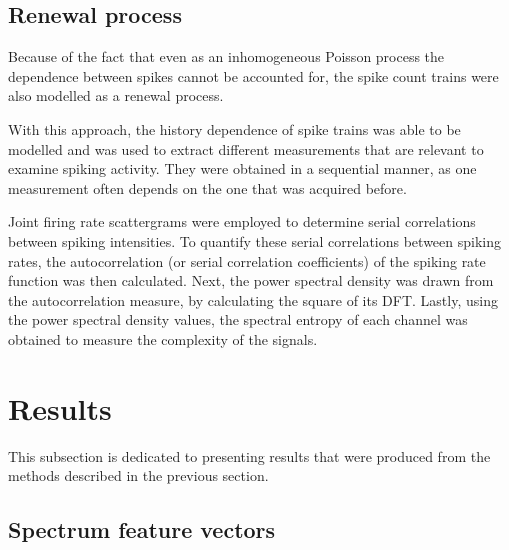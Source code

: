 \documentclass{article}
\begin{document}
\subsection{Renewal process}\label{RP Method}

Because of the fact that even as an inhomogeneous Poisson process the dependence between spikes cannot be accounted for, the spike count trains were also modelled as a renewal process.

With this approach, the history dependence of spike trains was able to be modelled and was used to extract different measurements that are relevant to examine spiking activity. 
They were obtained in a sequential manner, as one measurement often depends on the one that was acquired before.

Joint firing rate scattergrams were employed to determine serial correlations between spiking intensities. 
To quantify these serial correlations between spiking rates, the autocorrelation (or serial correlation coefficients) of the spiking rate function was then calculated. 
Next, the power spectral density was drawn from the autocorrelation measure, by calculating the square of its DFT. 
Lastly, using the power spectral density values, the spectral entropy of each channel was obtained to measure the complexity of the signals.

\newpage
\section{Results}

This subsection is dedicated to presenting results that were produced from the methods described in the previous section.

\subsection{Spectrum feature vectors}\label{SFV Results}
\end{document}
